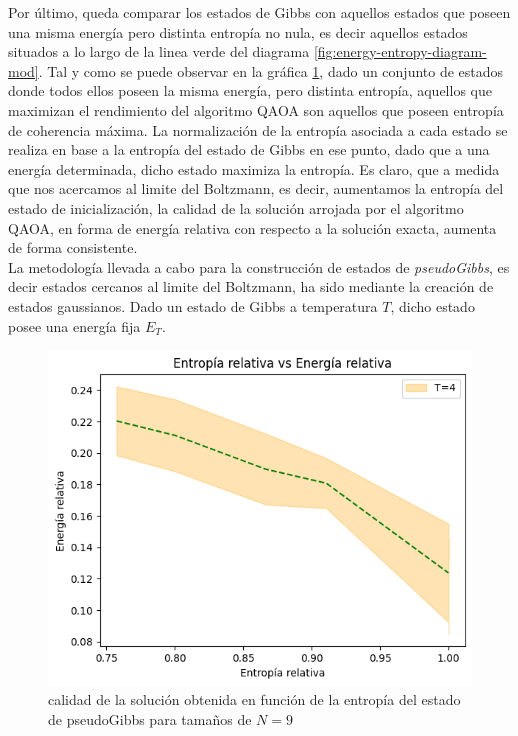 Por último, queda comparar los estados de Gibbs con aquellos estados que poseen una misma energía pero distinta entropía no nula, es decir aquellos estados situados a lo largo de la linea verde del diagrama \ref{fig:energy-entropy-diagram-mod}. Tal y como se puede observar en la gráfica \ref{fig:entropia_vs_energia_pseudogibbs}, dado un conjunto de estados donde todos ellos poseen la misma energía, pero distinta entropía, aquellos que maximizan el rendimiento del algoritmo QAOA son aquellos que poseen entropía de coherencia máxima. La normalización de la entropía asociada a cada estado se realiza en base a la entropía del estado de Gibbs en ese punto, dado que a una energía determinada, dicho estado maximiza la entropía. Es claro, que a medida que nos acercamos al limite del Boltzmann, es decir, aumentamos la entropía del estado de inicialización, la calidad de la solución arrojada por el algoritmo QAOA, en forma de energía relativa con respecto a la solución exacta, aumenta de forma consistente. \\

La metodología llevada a cabo para la construcción de estados de \textit{pseudoGibbs}, es decir estados cercanos al limite del Boltzmann, ha sido mediante la creación de estados gaussianos. Dado un estado de Gibbs a temperatura $T$, dicho estado posee una energía fija $E_{T}$.


\newpage

\begin{figure}[!h]
    \centering
    \includegraphics[scale = 0.75]{plt/06-entropia_vs_energia_pesudo_gibbs.png}
    \caption{calidad de la solución obtenida en función de la entropía del estado de pseudoGibbs para tamaños de $N=9$}
    \label{fig:entropia_vs_energia_pseudogibbs}
\end{figure}

